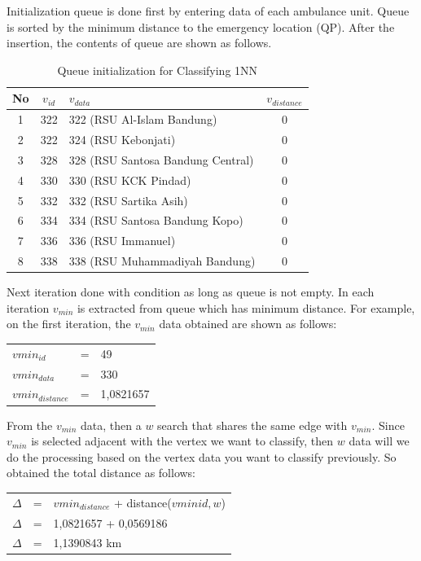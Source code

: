 Initialization queue is done first by entering data of each ambulance unit. Queue is sorted by the minimum distance to the emergency location (QP). After the insertion, the contents of queue are shown as follows.

\begin{table}[H] 
\centering
\begin{tabular}{|c|c|l|c|}
\hline
\textbf{No} & \textbf{$v_{id}$} & \textbf{$v_{data}$} & \textbf{$v_{distance}$}\\
\hline
1 &  322 & 322 (RSU Al-Islam Bandung) & 0\\
\hline
2 & 322 & 324 (RSU Kebonjati) & 0\\
\hline
3 & 328 & 328 (RSU Santosa Bandung Central) & 0\\
\hline
4 & 330 & 330 (RSU KCK Pindad) & 0\\
\hline
5 & 332 & 332 (RSU Sartika Asih) & 0\\
\hline
6 & 334 & 334 (RSU Santosa Bandung Kopo) & 0\\
\hline
7 & 336 & 336 (RSU Immanuel) & 0\\
\hline
8 & 338 & 338 (RSU Muhammadiyah Bandung) & 0\\
\hline
\end{tabular}
\caption{Queue initialization for Classifying 1NN}
\label{table:queue_inisialization}
\end{table}

Next iteration done with condition as long as queue is not empty. In each iteration $v_ {min}$ is extracted from queue which has minimum distance. For example, on the first iteration, the $v_{min}$ data obtained are shown as follows:

\begin{table}[H]
\begin{tabular}{lll}
$vmin_{id}$ & = & 49 \\
$vmin_{data}$ & = & 330 \\
$vmin_{distance}$ & = & 1,0821657 \\
\end{tabular}
\end{table}

From the $v_{min}$ data, then a $w$ search that shares the same edge with $v_ {min}$. Since $v_ {min}$ is selected adjacent with the vertex we want to classify, then $w$ data will we do the processing based on the vertex data you want to classify previously. So obtained the total distance as follows:

\begin{table}[H]
\begin{tabular}{lll}
$\Delta$ & = & $vmin_{distance}$ + distance($vmin{id}, w$) \\
$\Delta$ & = & 1,0821657 + 0,0569186 \\
$\Delta$ & = & 1,1390843 km \\
\end{tabular}
\end{table}


